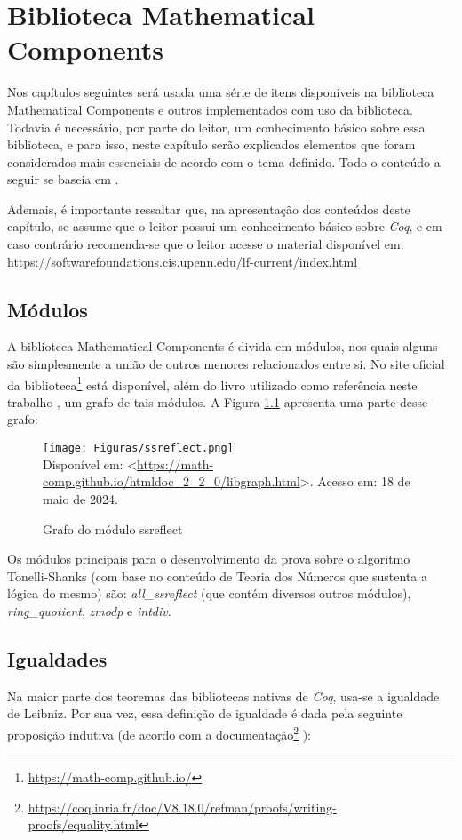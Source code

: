 \chapter{Biblioteca Mathematical Components}
\label{cap:mathcomp}

Nos capítulos seguintes será usada uma série de itens disponíveis na biblioteca Mathematical Components e outros implementados com uso da biblioteca. Todavia é necessário, por parte do leitor, um conhecimento básico sobre essa biblioteca, e para isso, neste capítulo serão explicados elementos que foram considerados mais essenciais de acordo com o tema definido. Todo o conteúdo a seguir se baseia em \cite{assia_mahboubi_2022_7118596}.

Ademais, é importante ressaltar que, na apresentação dos conteúdos deste capítulo, se assume que o leitor possui um conhecimento básico sobre \textit{Coq}, e em caso contrário recomenda-se que o leitor acesse o material disponível em: \url{https://softwarefoundations.cis.upenn.edu/lf-current/index.html}

\section{Módulos}
A biblioteca Mathematical Components é divida em módulos, nos quais alguns são simplesmente a união de outros menores relacionados entre si. No site oficial da biblioteca\footnote{\url{https://math-comp.github.io/}} está disponível, além do livro utilizado como referência neste trabalho \cite{assia_mahboubi_2022_7118596}, um grafo
de tais módulos. A Figura \ref{fig:graph-mathcomp} apresenta uma parte desse grafo:

\begin{figure}[h]
    \centering
    \caption{Grafo do módulo ssreflect}
    \texttt{[image: Figuras/ssreflect.png]}\\
    \footnotesize{Disponível em: <\url{https://math-comp.github.io/htmldoc_2_2_0/libgraph.html}>.
    Acesso em: 18 de maio de 2024.}
    \label{fig:graph-mathcomp}
\end{figure}

Os módulos principais para o desenvolvimento da prova sobre o algoritmo Tonelli-Shanks (com base no conteúdo de Teoria dos Números que sustenta a lógica do mesmo) são: \textit{all\_ssreflect} (que contém diversos outros módulos), \textit{ring\_quotient}, \textit{zmodp} e \textit{intdiv}.

\section{Igualdades}
Na maior parte dos teoremas das bibliotecas nativas de \textit{Coq}, usa-se a igualdade de Leibniz. Por sua vez, essa definição de igualdade é dada pela seguinte proposição indutiva (de acordo com a documentação\footnote{\url{https://coq.inria.fr/doc/V8.18.0/refman/proofs/writing-proofs/equality.html}} \cite{coqteam2022manual}):

